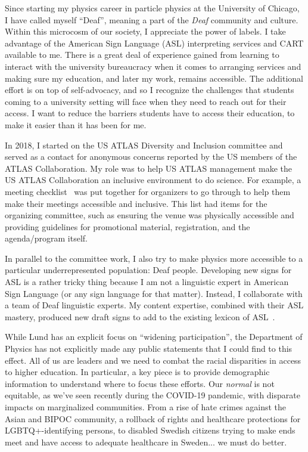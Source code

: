 Since starting my physics career in particle physics at the University of Chicago, I have called myself \enquote{Deaf}, meaning a part of the \textsl{Deaf} community and culture. Within this microcosm of our society, I appreciate the power of labels. I take advantage of the American Sign Language (ASL) interpreting services and CART available to me. There is a great deal of experience gained from learning to interact with the university bureaucracy when it comes to arranging services and making sure my education, and later my work, remains accessible. The additional effort is on top of self-advocacy, and so I recognize the challenges that students coming to a university setting will face when they need to reach out for their access. I want to reduce the barriers students have to access their education, to make it easier than it has been for me.

In 2018, I started on the US ATLAS Diversity and Inclusion committee and served as a contact for anonymous concerns reported by the US members of the ATLAS Collaboration. My role was to help US ATLAS management make the US ATLAS Collaboration an inclusive environment to do science. For example, a meeting checklist~ was put together for organizers to go through to help them make their meetings accessible and inclusive. This list had items for the organizing committee, such as ensuring the venue was physically accessible and providing guidelines for promotional material, registration, and the agenda/program itself.

In parallel to the committee work, I also try to make physics more accessible to a particular underrepresented population: Deaf people. Developing new signs for ASL is a rather tricky thing because I am not a linguistic expert in American Sign Language (or any sign language for that matter). Instead, I collaborate with a team of Deaf linguistic experts. My content expertise, combined with their ASL mastery, produced new draft signs to add to the existing lexicon of ASL~.

While Lund has an explicit focus on \enquote{widening participation}, the Department of Physics has not explicitly made any public statements that I could find to this effect. All of us are leaders and we need to combat the racial disparities in access to higher education. In particular, a key piece is to provide demographic information to understand where to focus these efforts. Our \textsl{normal} is not equitable, as we've seen recently during the COVID-19 pandemic, with disparate impacts on marginalized communities. From a rise of hate crimes against the Asian and BIPOC community, a rollback of rights and healthcare protections for LGBTQ+-identifying persons, to disabled Swedish citizens trying to make ends meet and have access to adequate healthcare in Sweden... we must do better.

